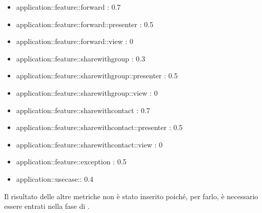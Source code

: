 \begin{itemize}
\item application::feature::forward : 0.7
\item application::feature::forward::presenter : 0.5
\item application::feature::forward::view : 0
\item application::feature::sharewithgroup : 0.3
\item application::feature::sharewithgroup::presenter : 0.5
\item application::feature::sharewithgroup::view : 0
\item application::feature::sharewithcontact : 0.7
\item application::feature::sharewithcontact::presenter : 0.5
\item application::feature::sharewithcontact::view : 0
\item application::feature::exception : 0.5
\item application::usecase:: 0.4

\end{itemize}

Il risultato delle altre metriche non è stato inserito poiché, per farlo, è necessario essere entrati nella fase di \COD.
